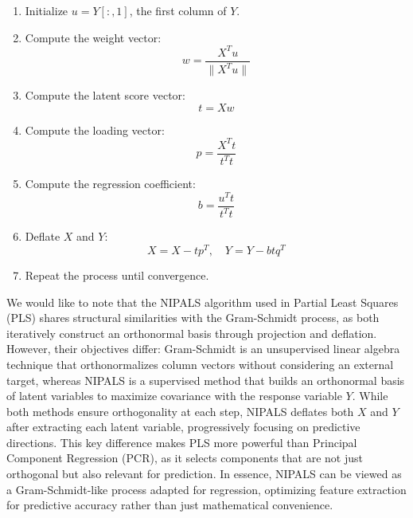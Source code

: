 \documentclass[11pt,twoside,a4paper]{article}
\begin{document}
\begin{enumerate}
    \item Initialize \( u = Y[:,1] \), the first column of \( Y \).
    \item Compute the weight vector:
        \begin{equation}
        w = \frac{X^T u}{\|X^T u\|}
        \end{equation}
    \item Compute the latent score vector:
        \begin{equation}
        t = Xw
        \end{equation}
    \item Compute the loading vector:
        \begin{equation}
        p = \frac{X^T t}{t^T t}
        \end{equation}
    \item Compute the regression coefficient:
        \begin{equation}
        b = \frac{u^T t}{t^T t}
        \end{equation}
    \item Deflate \( X \) and \( Y \):
        \begin{equation}
        X = X - tp^T, \quad Y = Y - btq^T
        \end{equation}
    \item Repeat the process until convergence.
\end{enumerate}

We would like to note that the NIPALS algorithm used in Partial Least Squares (PLS) shares structural similarities with the Gram-Schmidt process, as both iteratively construct an orthonormal basis through projection and deflation. However, their objectives differ: Gram-Schmidt is an unsupervised linear algebra technique that orthonormalizes column vectors without considering an external target, whereas NIPALS is a supervised method that builds an orthonormal basis of latent variables to maximize covariance with the response variable \( Y \). While both methods ensure orthogonality at each step, NIPALS deflates both \( X \) and \( Y \) after extracting each latent variable, progressively focusing on predictive directions. This key difference makes PLS more powerful than Principal Component Regression (PCR), as it selects components that are not just orthogonal but also relevant for prediction. In essence, NIPALS can be viewed as a Gram-Schmidt-like process adapted for regression, optimizing feature extraction for predictive accuracy rather than just mathematical convenience.
\end{document}
